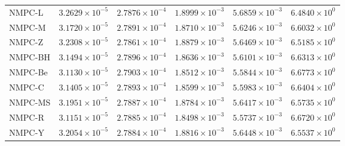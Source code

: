 \begin{tabular}{lccccc}
NMPC-L & $3.2629\times10^{-5}$ & $2.7876\times10^{-4}$ & $1.8999\times10^{-3}$ & $5.6859\times10^{-3}$ & $6.4840\times10^{0}$ \\
NMPC-M & $3.1720\times10^{-5}$ & $2.7891\times10^{-4}$ & $1.8710\times10^{-3}$ & $5.6246\times10^{-3}$ & $6.6032\times10^{0}$ \\
NMPC-Z & $3.2308\times10^{-5}$ & $2.7861\times10^{-4}$ & $1.8879\times10^{-3}$ & $5.6469\times10^{-3}$ & $6.5185\times10^{0}$ \\
NMPC-BH & $3.1494\times10^{-5}$ & $2.7896\times10^{-4}$ & $1.8636\times10^{-3}$ & $5.6101\times10^{-3}$ & $6.6313\times10^{0}$ \\
NMPC-Be & $3.1130\times10^{-5}$ & $2.7903\times10^{-4}$ & $1.8512\times10^{-3}$ & $5.5844\times10^{-3}$ & $6.6773\times10^{0}$ \\
NMPC-C & $3.1405\times10^{-5}$ & $2.7893\times10^{-4}$ & $1.8599\times10^{-3}$ & $5.5983\times10^{-3}$ & $6.6404\times10^{0}$ \\
NMPC-MS & $3.1951\times10^{-5}$ & $2.7887\times10^{-4}$ & $1.8784\times10^{-3}$ & $5.6417\times10^{-3}$ & $6.5735\times10^{0}$ \\
NMPC-R & $3.1151\times10^{-5}$ & $2.7885\times10^{-4}$ & $1.8498\times10^{-3}$ & $5.5737\times10^{-3}$ & $6.6720\times10^{0}$ \\
NMPC-Y & $3.2054\times10^{-5}$ & $2.7884\times10^{-4}$ & $1.8816\times10^{-3}$ & $5.6448\times10^{-3}$ & $6.5537\times10^{0}$ \\
\hline
\end{tabular}

